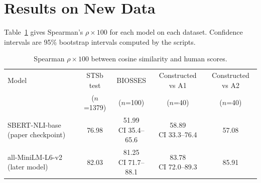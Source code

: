 \documentclass[11pt]{article}
\begin{document}
\section{Results on New Data}
\label{sec:results}

Table~\ref{tab:results} gives Spearman's $\rho \times 100$ for each model on each dataset. Confidence intervals are 95\% bootstrap intervals computed by the scripts.

\begin{table}[t]
\centering\small
\begin{tabular}{lcccc}
\toprule
Model & STSb test & BIOSSES & Constructed vs A1 & Constructed vs A2 \\
 & ($n$=1379) & ($n$=100) & ($n$=40) & ($n$=40) \\
\midrule
SBERT-NLI-base (paper checkpoint) & 76.98 & \shortstack{51.99\\{\scriptsize CI 35.4--65.6}} & \shortstack{58.89\\{\scriptsize CI 33.3--76.4}} & 57.08 \\
all-MiniLM-L6-v2 (later model) & 82.03 & \shortstack{81.25\\{\scriptsize CI 71.7--88.1}} & \shortstack{83.78\\{\scriptsize CI 72.0--89.3}} & 85.91 \\
\bottomrule
\end{tabular}
\caption{Spearman $\rho \times 100$ between cosine similarity and human scores.}
\label{tab:results}
\end{table}
\end{document}
